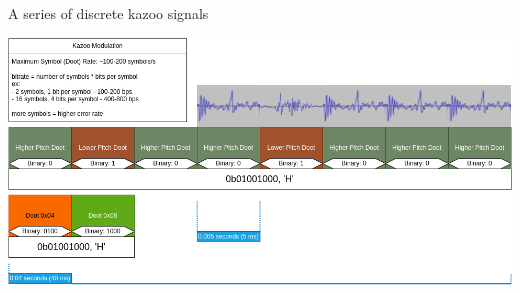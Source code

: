 \documentclass[
	11pt, %
]{beamer}
\begin{document}
\begin{frame}

  A series of discrete kazoo signals

  \begin{center}
    \includegraphics[width=1\linewidth]{kazoo_signals.png}
  \end{center}


\end{frame}


% 





\end{document}
